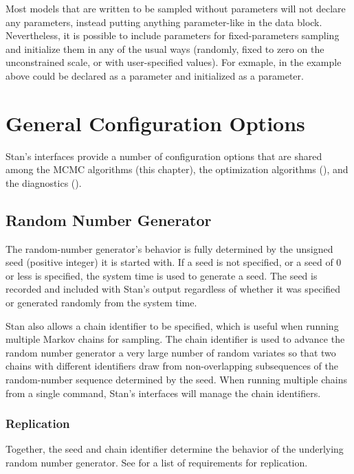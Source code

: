 Most models that are written to be sampled without parameters will not
declare any parameters, instead putting anything parameter-like in the
data block.  Nevertheless, it is possible to include parameters for
fixed-parameters sampling and initialize them in any of the usual ways
(randomly, fixed to zero on the unconstrained scale, or with
user-specified values).  For exmaple,  in the example
above could be declared as a parameter and initialized as a parameter.



\section{General Configuration Options}\label{general-config.section}

Stan's interfaces provide a number of configuration options that are
shared among the MCMC algorithms (this chapter), the optimization
algorithms (), and the diagnostics
().

\subsection{Random Number Generator}

The random-number generator's behavior is fully determined by the
unsigned seed (positive integer) it is started with. If a seed is not
specified, or a seed of 0 or less is specified, the system time is
used to generate a seed. The seed is recorded and included with Stan's
output regardless of whether it was specified or generated randomly
from the system time.

Stan also allows a chain identifier to be specified, which is useful
when running multiple Markov chains for sampling. The chain identifier
is used to advance the random number generator a very large number of
random variates so that two chains with different identifiers draw
from non-overlapping subsequences of the random-number sequence
determined by the seed.  When running multiple chains from a single
command, Stan's interfaces will manage the chain identifiers.

\subsubsection{Replication}

Together, the seed and chain identifier determine the behavior of the
underlying random number generator. See  for a
list of requirements for replication.


